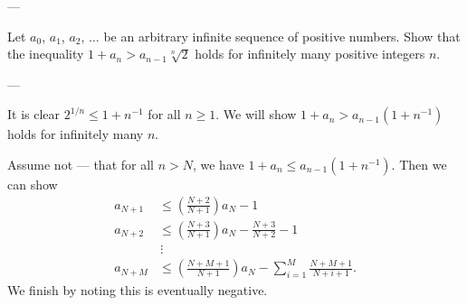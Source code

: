 
---

Let $a_0$, $a_1$, $a_2$, $\ldots$ be an arbitrary infinite sequence of positive numbers. Show that the inequality $1+a_n>a_{n-1}\sqrt[n]2$ holds for infinitely many positive integers $n$.

---

It is clear $2^{1/n}\le1+n^{-1}$ for all $n\ge1$. We will show $1+a_n>a_{n-1}\left(1+n^{-1}\right)$ holds for infinitely many $n$.

Assume not --- that for all $n>N$, we have $1+a_n\le a_{n-1}\left(1+n^{-1}\right)$. Then we can show
\begin{align*}
    a_{N+1}&\le\left(\frac{N+2}{N+1}\right)a_N-1\\
    a_{N+2}&\le\left(\frac{N+3}{N+1}\right)a_N-\frac{N+3}{N+2}-1\\
    &\,\vdots\\
    a_{N+M}&\le\left(\frac{N+M+1}{N+1}\right)a_N-\sum_{i=1}^M\frac{N+M+1}{N+i+1}.
\end{align*}
We finish by noting this is eventually negative.
